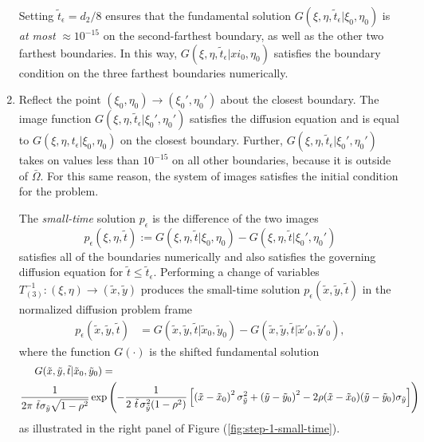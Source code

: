 \begin{enumerate}
  Setting $\tilde{t}_\epsilon = d_2/8$ ensures that the fundamental
  solution $G(\xi,\eta,\tilde{t}_\epsilon | \xi_0, \eta_0)$ is
  \textit{at most} $\approx 10^{-15}$ on the second-farthest boundary,
  as well as the other two farthest boundaries. In this way,
  $G(\xi,\eta,\tilde{t}_\epsilon | xi_0, \eta_0)$ satisfies the
  boundary condition on the three farthest boundaries numerically.

\item Reflect the point $(\xi_0, \eta_0) \to (\xi_0', \eta_0')$ about
  the closest boundary. The image function
  $G(\xi,\eta,\tilde{t}_\epsilon | \xi_0', \eta_0')$ satisfies the
  diffusion equation and is equal to
  $G(\xi,\eta,t_\epsilon | \xi_0, \eta_0)$ on the closest
  boundary. Further,
  $G(\xi,\eta,\tilde{t}_\epsilon | \xi_0', \eta_0')$ takes on values
  less than $10^{-15}$ on all other boundaries, because it is outside
  of $\bar{\Omega}$. For this same reason, the system of images
  satisfies the initial condition for the problem.

  The \textit{small-time} solution $p_\epsilon$ is the difference of the two images 
  \[
    p_\epsilon(\xi,\eta,\tilde{t}) := G(\xi,\eta,\tilde{t} | \xi_0, \eta_0) -
    G(\xi,\eta,\tilde{t} | \xi_0', \eta_0')
  \]
  satisfies all of the boundaries numerically and also satisfies the
  governing diffusion equation for
  $\tilde{t} \leq \tilde{t}_\epsilon$. Performing a change of
  variables $T_{(3)}^{-1}: (\xi,\eta) \to (\tilde{x}, \tilde{y})$
  produces the small-time solution
  $p_\epsilon(\tilde{x},\tilde{y},\tilde{t})$ in the normalized
  diffusion problem frame
  \begin{align}
    p_\epsilon(\tilde{x}, \tilde{y}, \tilde{t}) &= G(\tilde{x}, \tilde{y}, \tilde{t} | \tilde{x}_0, \tilde{y}_0) - G(\tilde{x}, \tilde{y}, \tilde{t} | \tilde{x}'_0, \tilde{y}'_0), \label{eq:p-epsilon}
  \end{align}
  where the function $G(\cdot)$ is the shifted fundamental solution
  \begin{align}
    G(\tilde{x}, \tilde{y}, \tilde{t} | \tilde{x}_0, \tilde{y}_0) &= \\ \nonumber
    \MoveEqLeft[8] \frac{1}{2\pi\,\, \tilde{t}\sigma_{\tilde{y}}\sqrt{1-\rho^2}} \exp\left( -\frac{1}{2\,\,\tilde{t}\, \sigma_{\tilde{y}}^2 (1-\rho^2)} \left[ \left(\tilde{x}-\tilde{x}_0\right)^2 \sigma_{\tilde{y}}^2 + \left(\tilde{y}-\tilde{y}_0\right)^2 - 2\rho(\tilde{x}-\tilde{x}_0)(\tilde{y}-\tilde{y}_0)\sigma_{\tilde{y}} \right]\right) \label{eq:Gfundamental}
    \end{align}
    as illustrated in the right panel of Figure
    (\ref{fig:step-1-small-time}).
\end{enumerate}

